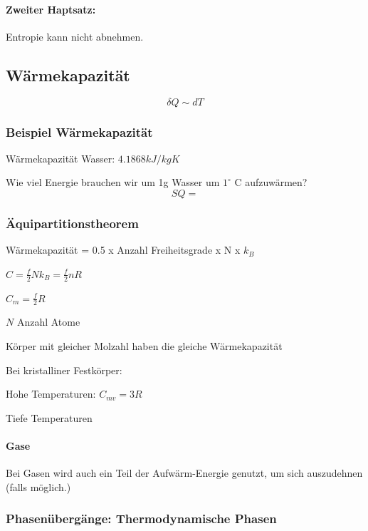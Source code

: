 \documentclass[a4paper]{scrartcl}
\begin{document}
\paragraph{Zweiter Haptsatz:}

Entropie kann nicht abnehmen.

\subsection{Wärmekapazität}

\[
	\delta Q \sim dT
\]

\subsubsection{Beispiel Wärmekapazität}

Wärmekapazität Wasser: $4.1868 kJ / kg K$

Wie viel Energie brauchen wir um 1g Wasser um $1^\circ$ C aufzuwärmen?
\[
SQ = 
\]





\subsubsection{Äquipartitionstheorem}

Wärmekapazität = 0.5 x Anzahl Freiheitsgrade x N x $k_B$

$C = \frac{f}{2}N k_B = \frac{f}{2} nR$

$C_m = \frac{f}{2} R$

$N$ Anzahl Atome


Körper mit gleicher Molzahl haben die gleiche Wärmekapazität


Bei kristalliner Festkörper:

Hohe Temperaturen: $C_{mv} = 3R$

Tiefe Temperaturen %

\paragraph{Gase}

Bei Gasen wird auch ein Teil der Aufwärm-Energie genutzt, um sich auszudehnen (falls möglich.)




\subsubsection{Phasenübergänge: Thermodynamische Phasen}
\end{document}
